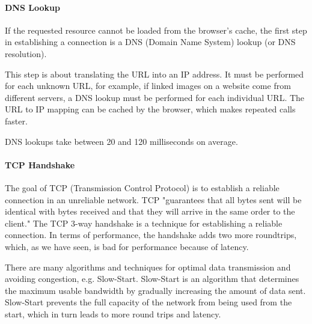 




\paragraph{DNS Lookup} %

If the requested resource cannot be loaded from the browser's cache, the first step in establishing a connection is a DNS (Domain Name System) lookup (or DNS resolution).

This step is about translating the URL into an IP address.
It must be performed for each unknown URL, for example, if linked images on a website come from different servers, a DNS lookup must be performed for each individual URL.
The URL to IP mapping can be cached by the browser, which makes repeated calls faster. %

DNS lookups take between 20 and 120 milliseconds on average. %





\paragraph{TCP Handshake} %

The goal of TCP (Transmission Control Protocol) is to establish a reliable connection in an unreliable network.
TCP  "guarantees that all bytes sent will be identical with bytes received and that they will arrive in the same order to the client." %
The TCP 3-way handshake is a technique for establishing a reliable connection.
In terms of performance, the handshake adds two more roundtrips, which, as we have seen, is bad for performance because of latency.

There are many algorithms and techniques for optimal data transmission and avoiding congestion, e.g. Slow-Start.
Slow-Start is an algorithm that determines the maximum usable bandwidth by gradually increasing the amount of data sent.
Slow-Start prevents the full capacity of the network from being used from the start, which in turn leads to more round trips and latency. %

